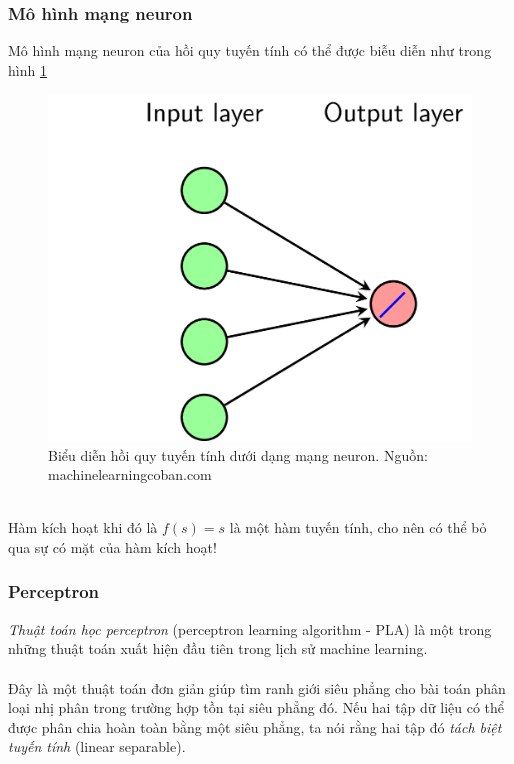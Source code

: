 \documentclass{article}
\begin{document}
\subsubsection*{Mô hình mạng neuron}
Mô hình mạng neuron của hồi quy tuyến tính có thể được biễu diễn như trong hình \ref{fig12}
\begin{figure}[ht!]
    \centering
    \includegraphics[width = 0.4\linewidth]{lr_nn.png}
    \caption{Biểu diễn hồi quy tuyến tính dưới dạng mạng neuron. Nguồn: machinelearningcoban.com}
    \label{fig12}
\end{figure}
\phantom{a}\\
Hàm kích hoạt khi đó là $f(s) = s$ là một hàm tuyến tính, cho nên có thể bỏ qua sự có mặt của hàm kích hoạt!

\subsubsection{Perceptron}
\textit{Thuật toán học perceptron} (perceptron learning algorithm - PLA) là một trong những thuật toán xuất hiện đầu tiên trong lịch sử machine learning. \\\\Đây là một thuật toán đơn giản giúp tìm ranh giới siêu phẳng cho bài toán phân loại nhị phân trong trường hợp tồn tại siêu phẳng đó. Nếu hai tập dữ liệu có thể được phân chia hoàn toàn bằng một siêu phẳng, ta nói rằng hai tập đó \textit{tách biệt tuyến tính} (linear separable).
\end{document}
